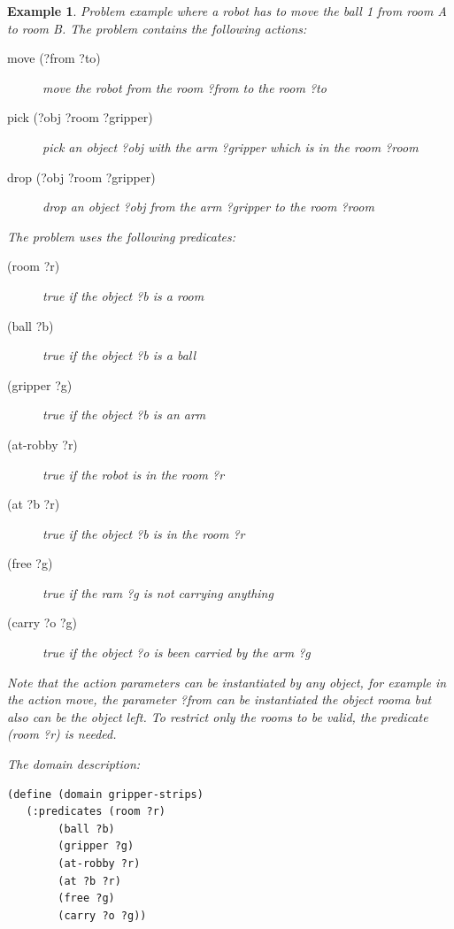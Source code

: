 \documentclass{report}
\theoremstyle{plain}
\newtheorem{example}{Example}[section]
\begin{document}
\begin{example}
\label{ex:pddl}
Problem example where a robot has to move the ball \textit{1} from room \textit{A} to room \textit{B}. The problem contains the following actions:
\begin{description}
    \item[move (?from ?to)] move the robot from the room \textit{?from} to the room \textit{?to} 
    \item[pick (?obj ?room ?gripper)] pick an  object \textit{?obj} with the arm \textit{?gripper} which is in the room \textit{?room}
    \item[drop (?obj ?room ?gripper)] drop an object \textit{?obj} from the arm \textit{?gripper} to the room \textit{?room}
\end{description}

\vspace{1\baselineskip}

The problem uses the following predicates:
\begin{description}
    \item[(room ?r)] true if the object \textit{?b} is a room
    \item[(ball ?b)] true if the object \textit{?b} is a ball
    \item[(gripper ?g)] true if the object \textit{?b} is an arm
    \item[(at-robby ?r)] true if the robot is in the room \textit{?r}
    \item[(at ?b ?r)] true if the object \textit{?b} is in the room \textit{?r}
    \item[(free ?g)] true if the ram \textit{?g} is not carrying anything
    \item[(carry ?o ?g)] true if the object \textit{?o} is been carried by the arm \textit{?g}
\end{description}

\vspace{1\baselineskip}

Note that the action parameters can be instantiated by any object, for example in the action \textit{move}, the parameter \textit{?from} can be instantiated the object \textit{rooma} but also can be the object \textit{left}. To restrict only the rooms to be valid, the predicate \textit{(room ?r)} is needed.

The domain description:
\begin{lstlisting}
(define (domain gripper-strips)
   (:predicates (room ?r)
        (ball ?b)
        (gripper ?g)
        (at-robby ?r)
        (at ?b ?r)
        (free ?g)
        (carry ?o ?g))


\end{lstlisting}
\end{example}
\end{document}
